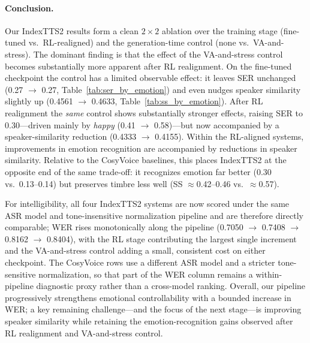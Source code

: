 \paragraph{Conclusion.}
Our IndexTTS2 results form a clean $2\times2$ ablation over the training stage (fine-tuned vs.\ RL-realigned) and the generation-time control (none vs.\ VA-and-stress). The dominant finding is that the effect of the VA-and-stress control becomes substantially more apparent after RL realignment. On the fine-tuned checkpoint the control has a limited observable effect: it leaves SER unchanged (0.27 $\rightarrow$ 0.27, Table~\ref{tab:ser_by_emotion}) and even nudges speaker similarity slightly up (0.4561 $\rightarrow$ 0.4633, Table~\ref{tab:ss_by_emotion}). After RL realignment the \emph{same} control shows substantially stronger effects, raising SER to 0.30---driven mainly by \textit{happy} (0.41 $\rightarrow$ 0.58)---but now accompanied by a speaker-similarity reduction (0.4333 $\rightarrow$ 0.4155). Within the RL-aligned systems, improvements in emotion recognition are accompanied by reductions in speaker similarity. Relative to the CosyVoice baselines, this places IndexTTS2 at the opposite end of the same trade-off: it recognizes emotion far better (0.30 vs.\ 0.13--0.14) but preserves timbre less well (SS $\approx$0.42--0.46 vs.\ $\approx$0.57).

For intelligibility, all four IndexTTS2 systems are now scored under the same ASR model and tone-insensitive normalization pipeline and are therefore directly comparable; WER rises monotonically along the pipeline (0.7050 $\rightarrow$ 0.7408 $\rightarrow$ 0.8162 $\rightarrow$ 0.8404), with the RL stage contributing the largest single increment and the VA-and-stress control adding a small, consistent cost on either checkpoint. The CosyVoice rows use a different ASR model and a stricter tone-sensitive normalization, so that part of the WER column remains a within-pipeline diagnostic proxy rather than a cross-model ranking. Overall, our pipeline progressively strengthens emotional controllability with a bounded increase in WER; a key remaining challenge---and the focus of the next stage---is improving speaker similarity while retaining the emotion-recognition gains observed after RL realignment and VA-and-stress control.
